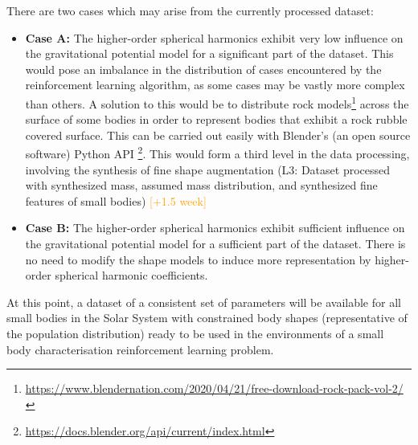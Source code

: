 \begin{enumerate}
    There are two cases which may arise from the currently processed dataset:
    \begin{itemize}
        \item \textbf{Case A:} The higher-order spherical harmonics exhibit very low influence on the gravitational potential model for a significant part of the dataset. This would pose an imbalance in the distribution of cases encountered by the reinforcement learning algorithm, as some cases may be vastly more complex than others. A solution to this would be to distribute rock models\footnote{\url{https://www.blendernation.com/2020/04/21/free-download-rock-pack-vol-2/}} across the surface of some bodies in order to represent bodies that exhibit a rock rubble covered surface. This can be carried out easily with Blender's (an open source software) Python API \footnote{\url{https://docs.blender.org/api/current/index.html}}. This would form a third level in the data processing, involving the synthesis of fine shape augmentation (L3: Dataset processed with synthesized mass, assumed mass distribution, and synthesized fine features of small bodies) \textcolor{orange}{[+1.5 week]}
        \item \textbf{Case B:} The higher-order spherical harmonics exhibit sufficient influence on the gravitational potential model for a sufficient part of the dataset. There is no need to modify the shape models to induce more representation by higher-order spherical harmonic coefficients.
    \end{itemize}

    At this point, a dataset of a consistent set of parameters will be available for all small bodies in the Solar System with constrained body shapes (representative of the population distribution) ready to be used in the environments of a small body characterisation reinforcement learning problem.


\end{enumerate}
